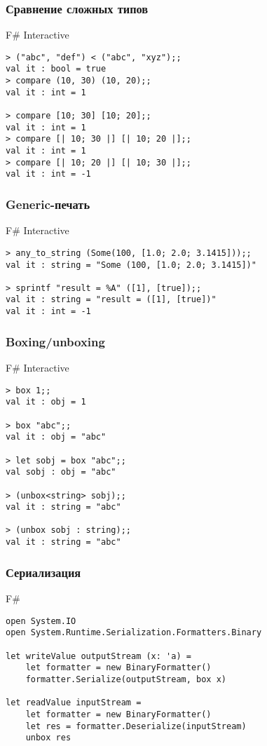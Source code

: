 \documentclass[xetex,mathserif,serif]{beamer}
\begin{document}
	\begin{frame}[fragile]
		\frametitle{Сравнение сложных типов}
		\begin{alertblock}{F\# Interactive}
			\begin{lstlisting}[keywordstyle=\color{black}]
> ("abc", "def") < ("abc", "xyz");;
val it : bool = true
> compare (10, 30) (10, 20);;
val it : int = 1

> compare [10; 30] [10; 20];;
val it : int = 1
> compare [| 10; 30 |] [| 10; 20 |];;
val it : int = 1
> compare [| 10; 20 |] [| 10; 30 |];;
val it : int = -1
\end{lstlisting}
\end{alertblock}
\end{frame}

	\begin{frame}[fragile]
		\frametitle{Generic-печать}
		\begin{alertblock}{F\# Interactive}
			\begin{lstlisting}[keywordstyle=\color{black}]
> any_to_string (Some(100, [1.0; 2.0; 3.1415]));;
val it : string = "Some (100, [1.0; 2.0; 3.1415])"

> sprintf "result = %A" ([1], [true]);;
val it : string = "result = ([1], [true])"
val it : int = -1
\end{lstlisting}
\end{alertblock}
\end{frame}

	\begin{frame}[fragile]
		\frametitle{Boxing/unboxing}
		\begin{alertblock}{F\# Interactive}
			\begin{lstlisting}[keywordstyle=\color{black}]
> box 1;;
val it : obj = 1

> box "abc";;
val it : obj = "abc"

> let sobj = box "abc";;
val sobj : obj = "abc"

> (unbox<string> sobj);;
val it : string = "abc"

> (unbox sobj : string);;
val it : string = "abc"
\end{lstlisting}
\end{alertblock}
\end{frame}

	\begin{frame}[fragile]
		\frametitle{Сериализация}
		\begin{exampleblock}{F\#}
			\begin{lstlisting}
open System.IO
open System.Runtime.Serialization.Formatters.Binary

let writeValue outputStream (x: 'a) =
    let formatter = new BinaryFormatter()
    formatter.Serialize(outputStream, box x)

let readValue inputStream =
    let formatter = new BinaryFormatter()
    let res = formatter.Deserialize(inputStream)
    unbox res
\end{lstlisting}
\end{exampleblock}
\end{frame}
\end{document}

